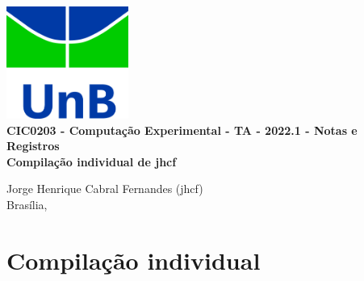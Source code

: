 \documentclass[12pt]{book}
\begin{document}
\clearpage
\thispagestyle{empty}

\begin{titlepage}
\begin{center}
 {\huge\bfseries \includegraphics[width=4cm]{unb-logo.jpg}\\
	CIC0203 - Computação Experimental - TA - 2022.1 - Notas e Registros\\ Compilação individual de jhcf\\
	}

 \vspace{1.5cm}
{\large	%
	Jorge Henrique Cabral Fernandes (jhcf)\\}
	\vspace{1.5cm}
	{\large Brasília, \DTMnow}
\end{center}
\end{titlepage}
    \listoftodos
	\printnoidxglossary
	\tableofcontents
	\listoffigures
	\listoftables
	\clearpage
{}

\pagestyle{fancy}

\part{Compilação individual\label{part:intro}}





\end{document}
